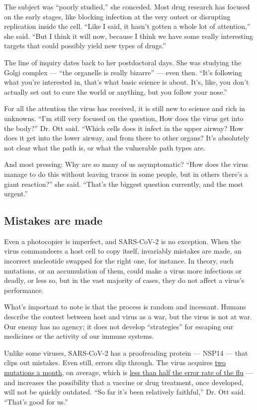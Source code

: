 The subject was ``poorly studied,'' she conceded. Most drug research has
focused on the early stages, like blocking infection at the very outset
or disrupting replication inside the cell. ``Like I said, it hasn't
gotten a whole lot of attention,'' she said. ``But I think it will now,
because I think we have some really interesting targets that could
possibly yield new types of drugs.''

The line of inquiry dates back to her postdoctoral days. She was
studying the Golgi complex --- ``the organelle is really bizarre'' ---
even then. ``It's following what you're interested in, that's what basic
science is about. It's, like, you don't actually set out to cure the
world or anything, but you follow your nose.''

For all the attention the virus has received, it is still new to science
and rich in unknowns. ``I'm still very focused on the question, How does
the virus get into the body?'' Dr. Ott said. ``Which cells does it
infect in the upper airway? How does it get into the lower airway, and
from there to other organs? It's absolutely not clear what the path is,
or what the vulnerable path types are.

And most pressing: Why are so many of us asymptomatic? ``How does the
virus manage to do this without leaving traces in some people, but in
others there's a giant reaction?'' she said. ``That's the biggest
question currently, and the most urgent.''

\hypertarget{mistakes-are-made}{%
\subsection{Mistakes are made}\label{mistakes-are-made}}

Even a photocopier is imperfect, and SARS-CoV-2 is no exception. When
the virus commandeers a host cell to copy itself, invariably mistakes
are made, an incorrect nucleotide swapped for the right one, for
instance. In theory, such mutations, or an accumulation of them, could
make a virus more infectious or deadly, or less so, but in the vast
majority of cases, they do not affect a virus's performance.

What's important to note is that the process is random and incessant.
Humans describe the contest between host and virus as a war, but the
virus is not at war. Our enemy has no agency; it does not develop
``strategies'' for escaping our medicines or the activity of our immune
systems.

Unlike some viruses, SARS-CoV-2 has a proofreading protein --- NSP14 ---
that clips out mistakes. Even still, errors slip through. The virus
acquires \href{https://bedford.io/blog/ncov-cryptic-transmission/}{two
mutations a month}, on average, which is
\href{https://jvi.asm.org/content/84/19/9733}{less than half the error
rate of the flu} --- and increases the possibility that a vaccine or
drug treatment, once developed, will not be quickly outdated. ``So far
it's been relatively faithful,'' Dr. Ott said. ``That's good for us.''

